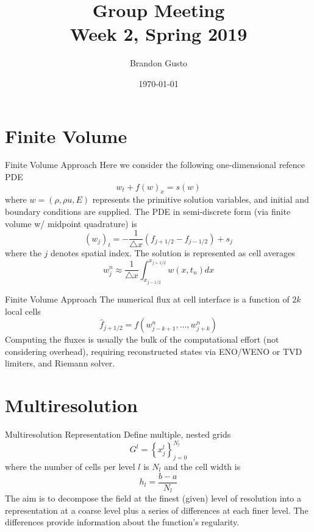 \documentclass{beamer}
\begin{document}
\title{Group Meeting \\ Week 2, Spring 2019}
\author{Brandon Gusto} %
\date{\today}
\frame{\titlepage}

\section{Finite Volume}

\begin{frame}[shrink=15]{Finite Volume Approach}
	Here we consider the following one-dimensional refence PDE
	\begin{equation*}
		w_{t} + f(w)_{x} = s(w)
	\end{equation*}
	where $w = (\rho,\rho u,E)$ represents the primitive solution variables, and initial and boundary
	conditions are supplied. The PDE in semi-discrete form (via finite volume w/ midpoint quadrature) is
	\begin{equation*}
		(w_{j})_{t} = -\frac{1}{\triangle x} \left( f_{j+1/2} - f_{j-1/2} \right) + s_{j}
	\end{equation*}
	where the $j$ denotes spatial index. The solution is represented as cell averages
	\begin{equation*}
		w^{n}_{j} \approx \frac{1}{\triangle x} \int_{x_{j-1/2}}^{x_{j+1/2}} w(x,t_{n}) dx
	\end{equation*}
\end{frame}


\begin{frame}[shrink=15]{Finite Volume Approach}
	 The numerical flux at cell interface is a function of $2k$ local cells
	\begin{equation*}
		\hat{f}_{j+1/2} = f(w^{n}_{j-k+1},\dots,w^{n}_{j+k})
	\end{equation*}
	Computing the fluxes is usually the bulk of the computational effort (not considering overhead), requiring
	reconstructed states via ENO/WENO or TVD limiters, and Riemann solver.

\end{frame}


\section{Multiresolution}

\begin{frame}[shrink=15]{Multiresolution Representation}
	Define multiple, nested grids
	\begin{equation*}
		G^{l} = \left\{ x^{l}_{j} \right\}_{j=0}^{N_{l}}
	\end{equation*}
	where the number of cells per level $l$ is $N_{l}$ and the cell width is
	\begin{equation*}
		h_{l} = \frac{b-a}{N_{l}}
	\end{equation*}
	The aim is to decompose the field at the finest (given) level of resolution into a representation at a
	coarse level plus a series of differences at each finer level. The differences provide information about the
	function's regularity.
\end{frame}
\end{document}
